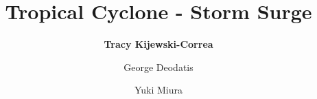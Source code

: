 %
%
%


%
%
%
%
%
%
%
%

\title{Tropical Cyclone - Storm Surge}
\author{
    \textbf{Tracy Kijewski-Correa} 
    \and George Deodatis
    \and Yuki Miura}
\tocauthor{}
%
%
\maketitle

